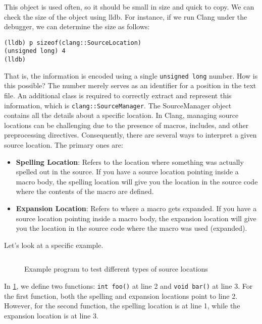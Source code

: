 This object is used often, so it should be small in size and quick to copy. We
can check the size of the object using lldb. For instance, if we run Clang under
the debugger, we can determine the size as follows: 
\begin{adjustwidth}{0em}{0em}
\begin{verbatim}
(lldb) p sizeof(clang::SourceLocation)
(unsigned long) 4
(lldb)
\end{verbatim}
\end{adjustwidth}
That is, the information is encoded using a single \texttt{unsigned
  long} number. How is this possible? The number merely serves as an identifier
for a position in the text file. An additional class is required to correctly
extract and represent this information, which is
\texttt{clang::SourceManager}. The SourceManager object contains all
the details about a specific location. In Clang, managing source locations can
be challenging due to the presence of macros, includes, and other preprocessing
directives. Consequently, there are several ways to interpret a given source
location. The primary ones are: 
\begin{itemize}
  \item \textbf{Spelling Location}: Refers to the location where something was
    actually spelled out in the source. If you have a source location pointing
    inside a macro body, the spelling location will give you the location in the
    source code where the contents of the macro are defined.
    \item \textbf{Expansion Location}: Refers to where a macro gets expanded. If
      you have a source location pointing inside a macro body, the expansion
      location will give you the location in the source code where the macro was
      used (expanded). 
\end{itemize}

Let's look at a specific example.
\begin{figure}[H]
\inputminted{c++}{src/part1/ch4_baselibs/recursivevisitor/functions.hpp}
\caption{Example program to test different types of source locations}
\label{lis:ch4:example:functions}
\end{figure}
In \cref{lis:ch4:example:functions}, we define two functions:
\texttt{int foo()} at line 2 and \texttt{void bar()} at line
3. For the first function, both the spelling and expansion locations point to
line 2. However, for the second function, the spelling location is at line 1,
while the expansion location is at line 3. 

